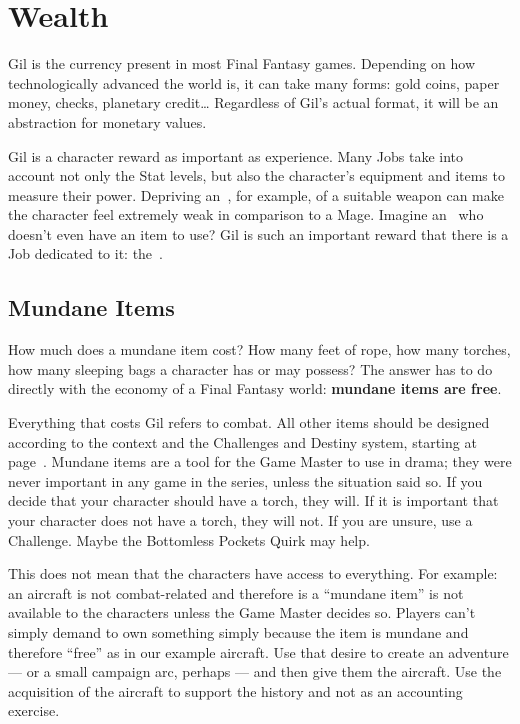 \section{Wealth}

\begin{multicols}{2}\label{sec:inv-wealth}
Gil is the currency present in most Final Fantasy games. Depending on how technologically advanced the world is, it can take many forms: gold coins, paper money, checks, planetary credit\ldots{} Regardless of Gil’s actual format, it will be an abstraction for monetary values.

Gil is a character reward as important as experience. Many Jobs take into account not only the Stat levels, but also the character’s equipment and items to measure their power. Depriving an~, for example, of a suitable weapon can make the character feel extremely weak in comparison to a Mage. Imagine an~ who doesn’t even have an item to use? Gil is such an important reward that there is a Job dedicated to it: the~.

\subsection{Mundane Items}\label{subsec:inv-mundane}
How much does a mundane item cost? How many feet of rope, how many torches, how many sleeping bags a character has or may possess? The answer has to do directly with the economy of a Final Fantasy world: \textbf{mundane items are free}.

Everything that costs Gil refers to combat. All other items should be designed according to the context and the Challenges and Destiny system, starting at page~\pageref{sec:challenges}. Mundane items are a tool for the Game Master to use in drama; they were never important in any game in the series, unless the situation said so. If you decide that your character should have a torch, they will. If it is important that your character does not have a torch, they will not. If you are unsure, use a Challenge. Maybe the Bottomless Pockets Quirk may help.

This does not mean that the characters have access to everything. For example: an aircraft is not combat-related and therefore is a “mundane item” is not available to the characters unless the Game Master decides so. Players can’t simply demand to own something simply because the item is mundane and therefore “free” as in our example aircraft. Use that desire to create an adventure --- or a small campaign arc, perhaps --- and then give them the aircraft. Use the acquisition of the aircraft to support the history and not as an accounting exercise.


\end{multicols}
